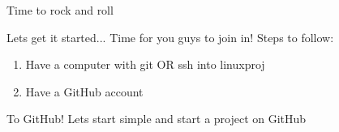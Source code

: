 \begin{frame}{Time to rock and roll}
    \begin{block}{Lets get it started...}
        Time for you guys to join in!
        Steps to follow:
        \begin{enumerate}
            \item Have a computer with git OR ssh into linuxproj
            \item Have a GitHub account
        \end{enumerate}
    \end{block}
    \pause
    \begin{exampleblock}{To GitHub!}
        Lets start simple and start a project on GitHub
    \end{exampleblock}
\end{frame}
